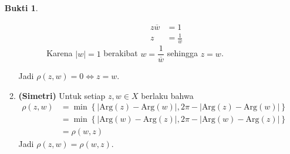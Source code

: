 \documentclass[a4paper]{article}
\theoremstyle{definition}
\newtheorem*{bukti}{Bukti}
\newcommand{\Arg}{\text{Arg}}
\begin{document}
\begin{enumerate}
\begin{bukti}
\begin{enumerate}
\begin{itemize}
\begin{itemize}
\begin{align*}
                                    z\overline{w}                       & = 1                      \\
                                    z                                   & = \frac{1}{\overline{w}}
                                  \end{align*}
                                  Karena $|w|=1$ berakibat $w=\dfrac{1}{\overline{w}}$ sehingga $z=w$.
                          \end{itemize}
                  \end{itemize}
                  Jadi \(\rho(z,w) = 0 \iff z = w\).
            \item \textbf{(Simetri)} Untuk setiap \( z, w \in X \) berlaku bahwa
                  \begin{align*}
                    \rho(z,w) & =\min\left\{ \left|\Arg(z)-\Arg(w)\right|, 2\pi - \left|\Arg(z) - \Arg(w)\right| \right\}  \\
                              & = \min\left\{ \left|\Arg(w)-\Arg(z)\right|, 2\pi - \left|\Arg(w) - \Arg(z)\right| \right\} \\
                              & =\rho(w,z)
                  \end{align*}
                  Jadi \(\rho(z,w) = \rho(w,z)\).


\end{enumerate}
\end{bukti}
\end{enumerate}
\end{document}
